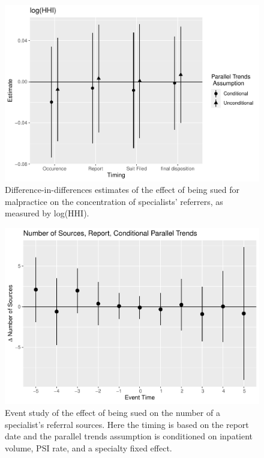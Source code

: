 \documentclass[
  12pt,
]{article}
\begin{document}
\FloatBarrier

\begin{figure}
\centering
\includegraphics{Paper_files/figure-latex/lhhiatt-1.pdf}
\caption{\label{fig:lhhiatt}Difference-in-differences estimates of the effect of being sued for malpractice on the concentration of specialists' referrers, as measured by log(HHI).}
\end{figure}

\FloatBarrier

\begin{figure}
\centering
\includegraphics{Paper_files/figure-latex/nsrcrepestud-1.pdf}
\caption{\label{fig:nsrcrepestud}Event study of the effect of being sued on the number of a specialist's referral sources. Here the timing is based on the report date and the parallel trends assumption is conditioned on inpatient volume, PSI rate, and a specialty fixed effect.}
\end{figure}
\end{document}
